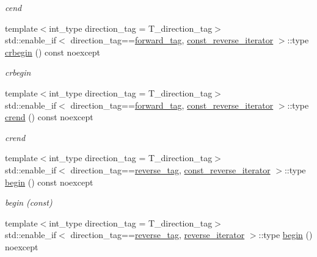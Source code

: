 \begin{DoxyCompactItemize}
\begin{DoxyCompactList}\small\item\em cend \end{DoxyCompactList}\item 
{\footnotesize template$<$int\+\_\+type direction\+\_\+tag = T\+\_\+direction\+\_\+tag$>$ }\\std\+::enable\+\_\+if$<$ direction\+\_\+tag==\hyperlink{namespaceIceBRG_a3f2c2517005b9902e3eb97894b072f91ac4e94566c20918ca2fe2c7ccdfdec928}{forward\+\_\+tag}, \hyperlink{classIceBRG_1_1labeled__array__vecs_aefecf82bcd5d24b2c6fc29b4f8930054}{const\+\_\+reverse\+\_\+iterator} $>$\+::type \hyperlink{classIceBRG_1_1labeled__array__vecs_a60f922c0bb7a9bd91d721823dfb6c07e}{crbegin} () const  noexcept
\begin{DoxyCompactList}\small\item\em crbegin \end{DoxyCompactList}\item 
{\footnotesize template$<$int\+\_\+type direction\+\_\+tag = T\+\_\+direction\+\_\+tag$>$ }\\std\+::enable\+\_\+if$<$ direction\+\_\+tag==\hyperlink{namespaceIceBRG_a3f2c2517005b9902e3eb97894b072f91ac4e94566c20918ca2fe2c7ccdfdec928}{forward\+\_\+tag}, \hyperlink{classIceBRG_1_1labeled__array__vecs_aefecf82bcd5d24b2c6fc29b4f8930054}{const\+\_\+reverse\+\_\+iterator} $>$\+::type \hyperlink{classIceBRG_1_1labeled__array__vecs_a6f46d6e7f48c18f32d928115338457ea}{crend} () const  noexcept
\begin{DoxyCompactList}\small\item\em crend \end{DoxyCompactList}\item 
{\footnotesize template$<$int\+\_\+type direction\+\_\+tag = T\+\_\+direction\+\_\+tag$>$ }\\std\+::enable\+\_\+if$<$ direction\+\_\+tag==\hyperlink{namespaceIceBRG_a3f2c2517005b9902e3eb97894b072f91a9793d1e2c6b63e17ed62034e78307b63}{reverse\+\_\+tag}, \hyperlink{classIceBRG_1_1labeled__array__vecs_aefecf82bcd5d24b2c6fc29b4f8930054}{const\+\_\+reverse\+\_\+iterator} $>$\+::type \hyperlink{classIceBRG_1_1labeled__array__vecs_ad3ed4cc81eddc2737699cf48522917ac}{begin} () const  noexcept
\begin{DoxyCompactList}\small\item\em begin (const) \end{DoxyCompactList}\item 
{\footnotesize template$<$int\+\_\+type direction\+\_\+tag = T\+\_\+direction\+\_\+tag$>$ }\\std\+::enable\+\_\+if$<$ direction\+\_\+tag==\hyperlink{namespaceIceBRG_a3f2c2517005b9902e3eb97894b072f91a9793d1e2c6b63e17ed62034e78307b63}{reverse\+\_\+tag}, \hyperlink{classIceBRG_1_1labeled__array__vecs_ab3d90428e6ba03e8a3bcb3b44629e3f5}{reverse\+\_\+iterator} $>$\+::type \hyperlink{classIceBRG_1_1labeled__array__vecs_a61696c6a614ebce96581fa774c4dc8b4}{begin} () noexcept

\end{DoxyCompactItemize}
